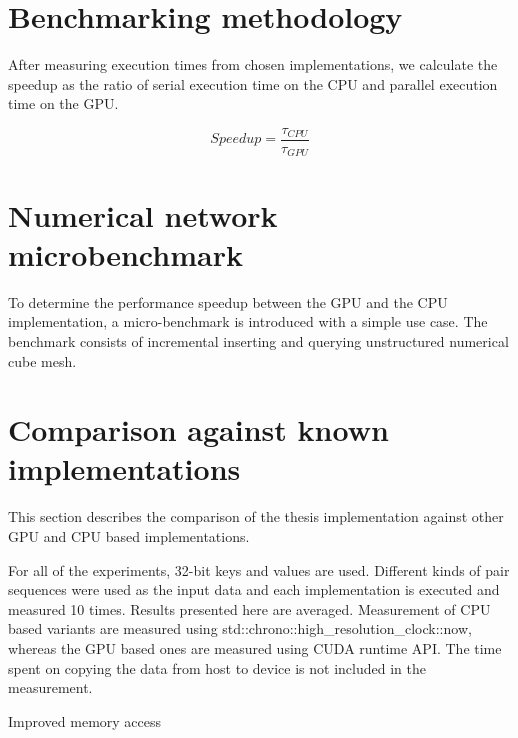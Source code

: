 \section{Benchmarking methodology}

After measuring execution times from chosen implementations, we calculate the speedup as the ratio of serial execution time on the CPU and parallel execution time on the GPU.

$$\mathit{Speedup} = \frac{\tau_{\mathit{CPU}}}{\tau_{\mathit{GPU}}}$$

\section{Numerical network microbenchmark}


To determine the performance speedup between the GPU and the CPU implementation, a micro-benchmark is introduced with a simple use case. The benchmark consists of incremental inserting and querying unstructured numerical cube mesh.

\section{Comparison against known implementations}

This section describes the comparison of the thesis implementation against other GPU and CPU based implementations. 

For all of the experiments, 32-bit keys and values are used. Different kinds of pair sequences were used as the input data and each implementation is executed and measured 10 times. Results presented here are averaged. Measurement of CPU based variants are measured using {std::chrono::high\_resolution\_clock::now}, whereas the GPU based ones are measured using CUDA runtime API. The time spent on copying the data from host to device is not included in the measurement.



 Improved memory access